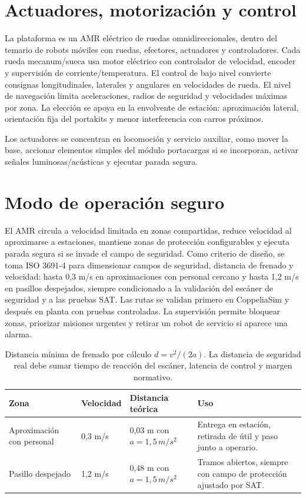 \section{Actuadores, motorización y control}

La plataforma es un AMR eléctrico de ruedas omnidireccionales, dentro del temario de robots móviles con ruedas, efectores, actuadores y controladores. Cada rueda mecanum/sueca usa motor eléctrico con controlador de velocidad, encoder y supervisión de corriente/temperatura. El control de bajo nivel convierte consignas longitudinales, laterales y angulares en velocidades de rueda. El nivel de navegación limita aceleraciones, radios de seguridad y velocidades máximas por zona. La elección se apoya en la envolvente de estación: aproximación lateral, orientación fija del portakits y menor interferencia con carros próximos.

Los actuadores se concentran en locomoción y servicio auxiliar, como mover la base, accionar elementos simples del módulo portacargas si se incorporan, activar señales luminosas/acústicas y ejecutar parada segura.

\section{Modo de operación seguro}

El AMR circula a velocidad limitada en zonas compartidas, reduce velocidad al aproximarse a estaciones, mantiene zonas de protección configurables y ejecuta parada segura si se invade el campo de seguridad. Como criterio de diseño, se toma ISO 3691-4 \cite{iso36914} para dimensionar campos de seguridad, distancia de frenado y velocidad: hasta 0,3 m/s en aproximaciones con personal cercano y hasta 1,2 m/s en pasillos despejados, siempre condicionado a la validación del escáner de seguridad y a las pruebas SAT. Las rutas se validan primero en CoppeliaSim y después en planta con pruebas controladas. La supervisión permite bloquear zonas, priorizar misiones urgentes y retirar un robot de servicio si aparece una alarma.

\begin{table}[H]
\centering
\begin{tabularx}{0.92\textwidth}{P{0.24\textwidth}P{0.22\textwidth}P{0.22\textwidth}X}
\toprule
Zona & Velocidad & Distancia teórica & Uso\\
\midrule
Aproximación con personal & 0,3 m/s & 0,03 m con \(a=1{,}5\,m/s^2\) & Entrega en estación, retirada de útil y paso junto a operario.\\
Pasillo despejado & 1,2 m/s & 0,48 m con \(a=1{,}5\,m/s^2\) & Tramos abiertos, siempre con campo de protección ajustado por SAT.\\
\bottomrule
\end{tabularx}
\caption{Distancia mínima de frenado por cálculo \(d=v^2/(2a)\). La distancia de seguridad real debe sumar tiempo de reacción del escáner, latencia de control y margen normativo.}
\label{tab:frenado-amr}
\end{table}

